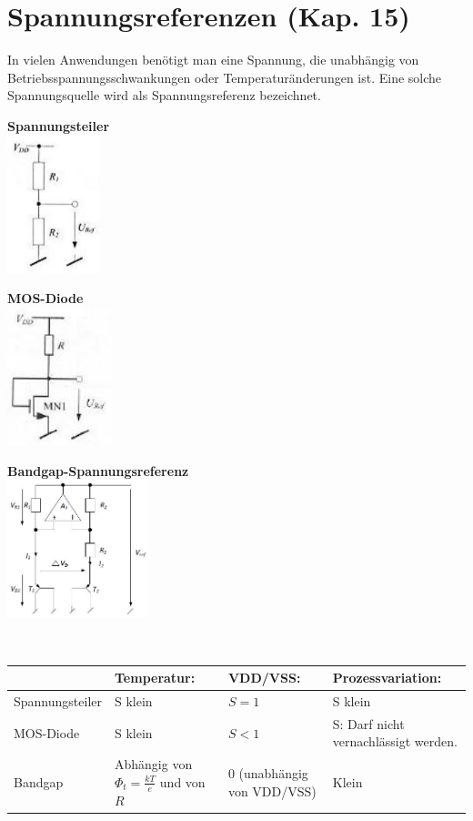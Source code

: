 \section{Spannungsreferenzen (Kap. 15)}
In vielen Anwendungen benötigt man eine Spannung, die unabhängig von Betriebsspannungsschwankungen oder Temperaturänderungen ist.
Eine solche Spannungsquelle wird als Spannungsreferenz bezeichnet.\\
\begin{minipage}[t]{0.2\textwidth}
	\textbf{Spannungsteiler}\\
	\includegraphics[height=4cm]{chapters/Spannungsref/images/Spannungsteiler}
\end{minipage}
\begin{minipage}[t]{0.2\textwidth}
	\textbf{MOS-Diode}\\
	\includegraphics[height=4cm]{chapters/Spannungsref/images/MOS-Diode}
\end{minipage}
\begin{minipage}[t]{0.5\textwidth}
	\textbf{Bandgap-Spannungsreferenz}\\
	\includegraphics[height=4cm]{chapters/Spannungsref/images/BandgapRealisation}
\end{minipage}\\
\begin{tabular}{|p{2.4cm}|p{4cm}|l|l|}
	\hline
	&\textbf{Temperatur:}&\textbf{VDD/VSS:}&\textbf{Prozessvariation:}\\ \hline
	Spannungsteiler&S klein&$S = 1$&S klein\\ \hline
	MOS-Diode&S klein&$S < 1$&S: Darf nicht vernachlässigt werden.\\ \hline
	Bandgap&Abhängig von $\Phi_t=\frac{kT}{e}$ und von $R$&0 (unabhängig von VDD/VSS)&Klein\\ \hline
\end{tabular}\\
